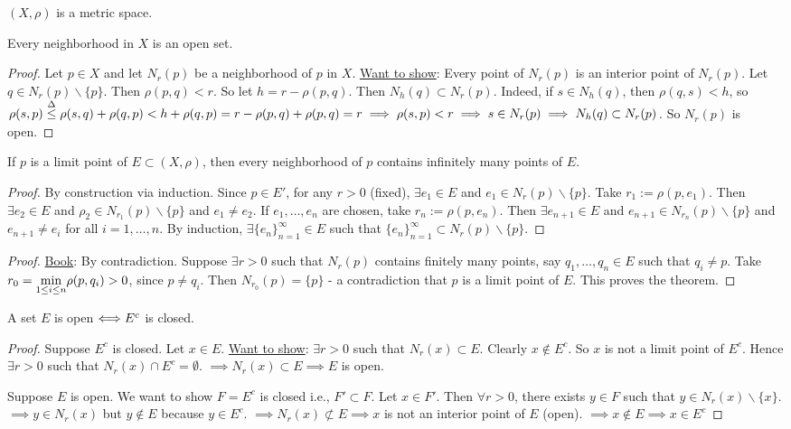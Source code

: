 \documentclass[]{article}
\begin{document}
$(X,\rho)$ is a metric space.

\begin{theorem}
	Every neighborhood in $X$ is an open set.
\end{theorem}
\begin{proof}
	Let $p\in X$ and let $N_r(p)$ be a neighborhood of $p$ in $X$.
	\ul{Want to show}: Every point of $N_r(p)$ is an interior point of $N_r(p)$.
	Let $q\in N_r(p)\backslash\{p\}$. Then $\rho(p,q)<r$. So let $h = r-\rho(p,q)$.
	Then $N_h(q)\subset N_r(p)$. Indeed, if $s\in N_h(q)$, then $\rho(q,s)<h$, so $\rho(s,p) \overset{\Delta}{\leq} \rho(s,q)+\rho(q,p) < h+ \rho(q,p) = r-\rho(p,q)+\rho(p,q) = r \implies \rho(s,p) < r \implies s\in N_r(p) \implies N_h(q) \subset N_r(p)$.
	So $N_r(p)$ is open.
\end{proof}

\begin{theorem}
	If $p$ is a limit point of $E\subset (X,\rho)$, then every neighborhood of $p$ contains infinitely many points of $E$.
\end{theorem}
\begin{proof}
	By construction via induction. Since $p\in E'$, for any $r>0$ (fixed), $\exists e_1\in E$ and $e_1\in N_r(p)\backslash\{p\}$.
	Take $r_1 := \rho(p,e_1)$. Then $\exists e_2\in E$ and $\rho_2\in N_{r_1}(p)\backslash\{p\}$ and $e_1\neq e_2$.
	If $e_1,\dots,e_n$ are chosen, take $r_n:=\rho(p,e_n)$. Then $\exists e_{n+1}\in E$ and $e_{n+1}\in N_{r_n}(p)\backslash\{p\}$ and $e_{n+1}\neq e_i$ for all $i=1,\dots, n$.
	By induction, $\exists \{e_n\}_{n=1}^\infty\in E$ such that $\{e_n\}_{n=1}^\infty \subset N_r(p)\backslash\{p\}$.
\end{proof}
\begin{proof}
	\ul{Book}: By contradiction.
	Suppose $\exists r>0$ such that $N_r(p)$ contains finitely many points, say $q_1,\dots,q_n\in E$ such that $q_i\neq p$.
	Take $r_0 = \underset{1\leq i \leq n}{\min} \rho(p,q_i) > 0$, since $p\neq q_i$.
	Then $N_{r_0}(p) = \{p\}$ - a contradiction that $p$ is a limit point of $E$. This proves the theorem.
\end{proof}

\begin{theorem}
	A set $E$ is open $\Longleftrightarrow E^c$ is closed.
\end{theorem}
\begin{proof}
	\say{$\Lla$} Suppose $E^c$ is closed. Let $x\in E$.
	\ul{Want to show}: $\exists r>0$ such that $N_r(x)\subset E$.
	Clearly $x\notin E^c$. So $x$ is not a limit point of $E^c$.
	Hence $\exists r>0$ such that $N_r(x)\cap E^c = \emptyset$.
	$\implies N_r(x) \subset E \implies E$ is open.

	\say{$\implies$} Suppose $E$ is open. We want to show $F=E^c$ is closed i.e., $F'\subset F$.
	Let $x\in F'$. Then $\forall r>0$, there exists $y\in F$ such that $y\in N_r(x)\backslash\{x\}$.
	$\implies y\in N_r(x)$ but $y\notin E$ because $y\in E^c$.
	$\implies N_r(x)\not\subset E \implies x$ is not an interior point of $E$ (open).
	$\implies x\notin E \implies x\in E^c$
\end{proof}
\end{document}
